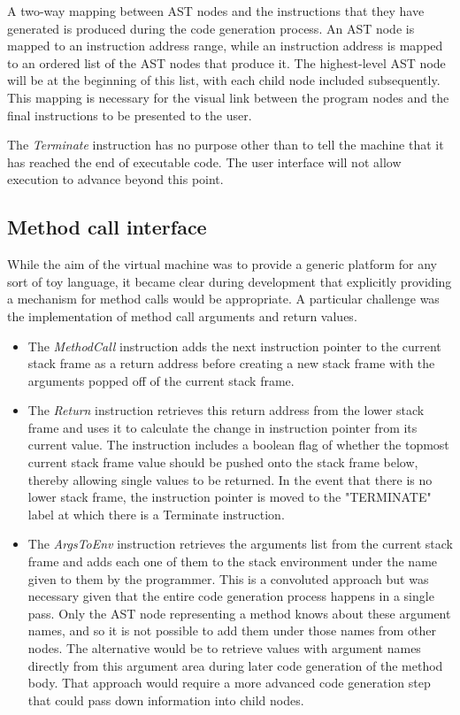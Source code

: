 A two-way mapping between AST nodes and the instructions that they have generated is produced during the code generation process. An AST node is mapped to an instruction address range, while an instruction address is mapped to an ordered list of the AST nodes that produce it. The highest-level AST node will be at the beginning of this list, with each child node included subsequently. This mapping is necessary for the visual link between the program nodes and the final instructions to be presented to the user.

The \textit{Terminate} instruction has no purpose other than to tell the machine that it has reached the end of executable code. The user interface will not allow execution to advance beyond this point. 

\subsection{Method call interface}

While the aim of the virtual machine was to provide a generic platform for any sort of toy language, it became clear during development that explicitly providing a mechanism for method calls would be appropriate. A particular challenge was the implementation of method call arguments and return values.

\begin{itemize}
\item The \textit{MethodCall} instruction adds the next instruction pointer to the current stack frame as a return address before creating a new stack frame with the arguments popped off of the current stack frame.
\item The \textit{Return} instruction retrieves this return address from the lower stack frame and uses it to calculate the change in instruction pointer from its current value. The instruction includes a boolean flag of whether the topmost current stack frame value should be pushed onto the stack frame below, thereby allowing single values to be returned. In the event that there is no lower stack frame, the instruction pointer is moved to the "TERMINATE" label at which there is a Terminate instruction.
\item The \textit{ArgsToEnv} instruction retrieves the arguments list from the current stack frame and adds each one of them to the stack environment under the name given to them by the programmer. This is a convoluted approach but was necessary given that the entire code generation process happens in a single pass. Only the AST node representing a method knows about these argument names, and so it is not possible to add them under those names from other nodes. The alternative would be to retrieve values with argument names directly from this argument area during later code generation of the method body. That approach would require a more advanced code generation step that could pass down information into child nodes.
\end{itemize}

